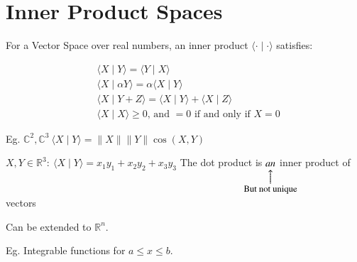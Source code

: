 \documentclass{report}
\makeatletter
\newcommand\parrow[3][3ex]{%
 \begin{array}[t]{@{}c@{}} #2 \\
  \left\uparrow\vcenter{\hrule height #1}\right.\kern-\nulldelimiterspace\\
  \makebox[0pt]{\small#3}
  \end{array}%
}
\makeatother
\begin{document}
\setcounter{chapter}{2}

\chapter{Inner Product Spaces}

For a Vector Space over real numbers, an inner product $\langle\cdot \mid \cdot\rangle$ satisfies:

$$
\begin{aligned}
& \langle X \mid Y\rangle=\langle Y \mid X\rangle \\
& \langle X \mid \alpha Y\rangle=\alpha\langle X \mid Y\rangle \\
& \langle X \mid Y+Z\rangle=\langle X \mid Y\rangle+\langle X \mid Z\rangle\\
& \langle X \mid X\rangle \geqslant 0 \text {, and }=0 \text { if and only if } X=0
\end{aligned}
$$

Eg. $\mathbb{C}^{2},\mathbb{C}^{3} \ \langle X \mid Y\rangle=\|X\|\|Y\| \cos (X, Y)$

$  X,Y \in \mathbb{R}^{3}: \ \langle X \mid Y\rangle=x_{1} y_{1}+x_{2} y_{2}+x_{3} y_{3}$ The dot product is $\parrow{an}{But not unique}$ inner product of vectors

Can be extended to $\mathbb{R}^{n}$.

Eg. Integrable functions for $a \leqslant x \leqslant b$.
\end{document}
